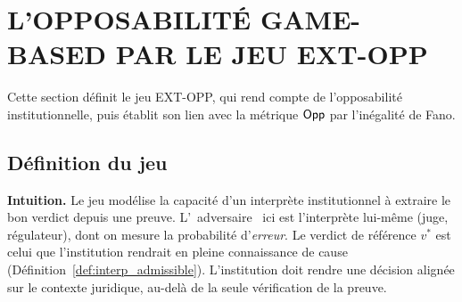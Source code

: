 \section{L'OPPOSABILIT\'E GAME-BASED PAR LE JEU EXT-OPP}
\label{sec:gamebased_opposabilite}
\begin{sloppypar}

Cette section d\'efinit le jeu EXT-OPP, qui rend compte de l'opposabilit\'e institutionnelle,
puis \'etablit son lien avec la m\'etrique $\mathsf{Opp}$ par l'in\'egalit\'e de Fano.

\subsection{D\'efinition du jeu}

\noindent\textbf{Intuition.} Le jeu mod\'elise la capacit\'e d'un interpr\`ete
institutionnel \`a extraire le bon verdict depuis une preuve. L'\guillemotleft~adversaire~\guillemotright
ici est l'interpr\`ete lui-m\^eme (juge, r\'egulateur), dont on mesure la probabilit\'e
d'\emph{erreur}. Le verdict de r\'ef\'erence $v^*$ est celui que l'institution rendrait en
pleine connaissance de cause (D\'efinition~\ref{def:interp_admissible}).
L'institution doit rendre une d\'ecision align\'ee sur le contexte juridique, au-del\`a
de la seule v\'erification de la preuve.


\end{sloppypar}
